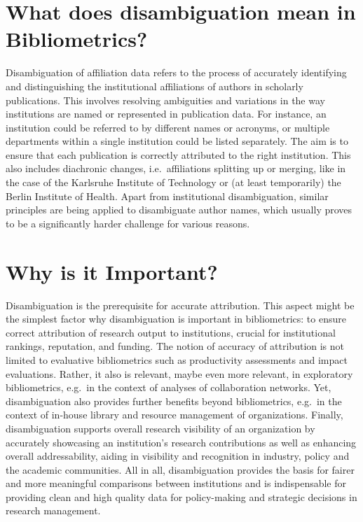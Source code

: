 \documentclass[
  letterpaper,
]{scrreprt}
\begin{document}
\section{What does disambiguation mean in
Bibliometrics?}\label{what-does-disambiguation-mean-in-bibliometrics}

Disambiguation of affiliation data refers to the process of accurately
identifying and distinguishing the institutional affiliations of authors
in scholarly publications. This involves resolving ambiguities and
variations in the way institutions are named or represented in
publication data. For instance, an institution could be referred to by
different names or acronyms, or multiple departments within a single
institution could be listed separately. The aim is to ensure that each
publication is correctly attributed to the right institution. This also
includes diachronic changes, i.e.~affiliations splitting up or merging,
like in the case of the Karlsruhe Institute of Technology or (at least
temporarily) the Berlin Institute of Health. Apart from institutional
disambiguation, similar principles are being applied to disambiguate
author names, which usually proves to be a significantly harder
challenge for various reasons.

\section{Why is it Important?}\label{why-is-it-important-2}

Disambiguation is the prerequisite for accurate attribution. This aspect
might be the simplest factor why disambiguation is important in
bibliometrics: to ensure correct attribution of research output to
institutions, crucial for institutional rankings, reputation, and
funding. The notion of accuracy of attribution is not limited to
evaluative bibliometrics such as productivity assessments and impact
evaluations. Rather, it also is relevant, maybe even more relevant, in
exploratory bibliometrics, e.g.~in the context of analyses of
collaboration networks. Yet, disambiguation also provides further
benefits beyond bibliometrics, e.g.~in the context of in-house library
and resource management of organizations. Finally, disambiguation
supports overall research visibility of an organization by accurately
showcasing an institution's research contributions as well as enhancing
overall addressability, aiding in visibility and recognition in
industry, policy and the academic communities. All in all,
disambiguation provides the basis for fairer and more meaningful
comparisons between institutions and is indispensable for providing
clean and high quality data for policy-making and strategic decisions in
research management.
\end{document}
